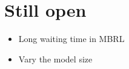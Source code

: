 \documentclass[
reprint,
amsmath,amssymb,amsfonts,clevref,
aps,
prstab,
]{revtex4-2}
\begin{document}
\section{Still open}
	\begin{itemize}
	\item Long waiting time in MBRL	
	\item Vary the model size
\end{itemize}
	
	
	
\end{document}
